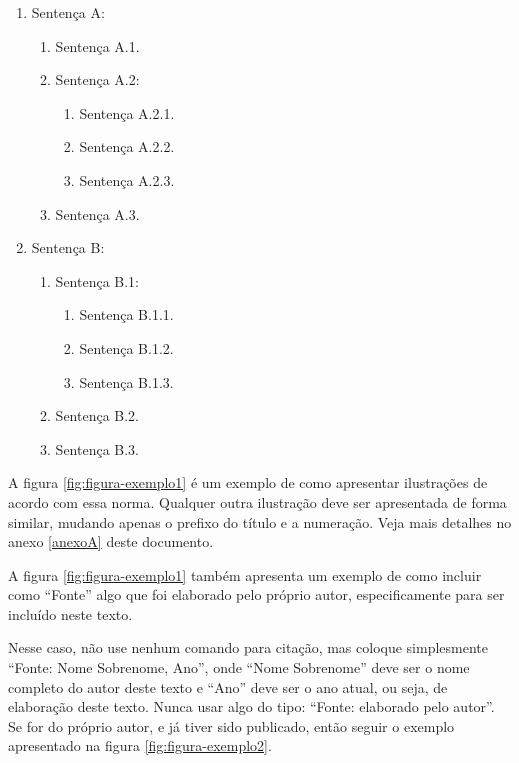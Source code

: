 \documentclass[
	12pt,				%
	oneside,			%
	a4paper,			%
	english,			%
	brazil				%
	]{abntex2ppgsi}
\begin{document}
\begin{enumerate}
	\item Sentença A:
  \begin{enumerate}
	  \item Sentença A.1.
	  \item Sentença A.2:
    \begin{enumerate}
	    \item Sentença A.2.1.
	    \item Sentença A.2.2.
	    \item Sentença A.2.3.
    \end{enumerate}
	  \item Sentença A.3.
	\end{enumerate}
  \item Sentença B:
  \begin{enumerate}
	  \item Sentença B.1:
      \begin{enumerate}
  	    \item Sentença B.1.1.
  	    \item Sentença B.1.2.
  	    \item Sentença B.1.3.
      \end{enumerate}
	  \item Sentença B.2.
	  \item Sentença B.3.
  \end{enumerate}
\end{enumerate}

A figura \ref{fig:figura-exemplo1} é um exemplo de como apresentar ilustrações de acordo com essa norma. Qualquer outra ilustração deve ser apresentada de forma similar, mudando apenas o prefixo do título e a numeração. Veja mais detalhes no anexo \ref{anexoA} deste documento.

A figura \ref{fig:figura-exemplo1} também apresenta um exemplo de como incluir como ``Fonte'' algo que foi elaborado pelo próprio autor, especificamente para ser incluído neste texto. 

Nesse caso, não use nenhum comando para citação, mas coloque simplesmente ``Fonte: Nome Sobrenome, Ano'', onde ``Nome Sobrenome'' deve ser o nome completo do autor deste texto e ``Ano'' deve ser o ano atual, ou seja, de elaboração deste texto. Nunca usar algo do tipo: ``Fonte: elaborado pelo autor''. Se for do próprio autor, e já tiver sido publicado, então seguir o exemplo apresentado na figura \ref{fig:figura-exemplo2}.
\end{document}
